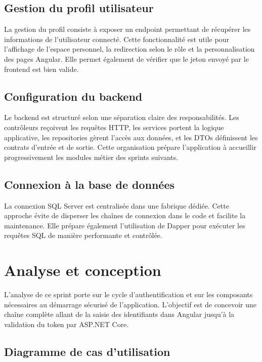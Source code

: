 \documentclass[12pt,a4paper]{report}
\begin{document}
\subsection{Gestion du profil utilisateur}

La gestion du profil consiste à exposer un endpoint permettant de récupérer les informations de l'utilisateur connecté. Cette fonctionnalité est utile pour l'affichage de l'espace personnel, la redirection selon le rôle et la personnalisation des pages Angular. Elle permet également de vérifier que le jeton envoyé par le frontend est bien valide.

\subsection{Configuration du backend}

Le backend est structuré selon une séparation claire des responsabilités. Les contrôleurs reçoivent les requêtes HTTP, les services portent la logique applicative, les repositories gèrent l'accès aux données, et les DTOs définissent les contrats d'entrée et de sortie. Cette organisation prépare l'application à accueillir progressivement les modules métier des sprints suivants.

\subsection{Connexion à la base de données}

La connexion SQL Server est centralisée dans une fabrique dédiée. Cette approche évite de disperser les chaînes de connexion dans le code et facilite la maintenance. Elle prépare également l'utilisation de Dapper pour exécuter les requêtes SQL de manière performante et contrôlée.

\section{Analyse et conception}

L'analyse de ce sprint porte sur le cycle d'authentification et sur les composants nécessaires au démarrage sécurisé de l'application. L'objectif est de concevoir une chaîne complète allant de la saisie des identifiants dans Angular jusqu'à la validation du token par ASP.NET Core.

\subsection{Diagramme de cas d'utilisation}
\end{document}
